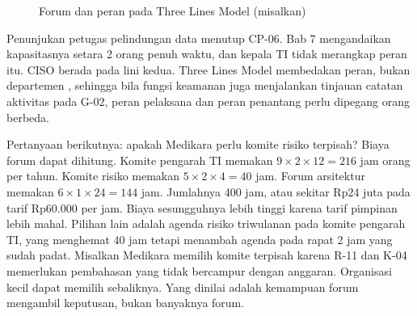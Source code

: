 \begin{figure}[!htb]
  \centering
  
  \caption{Forum dan peran pada Three Lines Model (misalkan)}
  \label{fig:ch08-peta-peran}
\end{figure}

Penunjukan petugas pelindungan data menutup CP-06. Bab 7 mengandaikan kapasitasnya setara 2 orang
penuh waktu, dan kepala TI tidak merangkap peran itu. CISO berada pada lini kedua. Three Lines
Model membedakan peran, bukan departemen \cite{iia-tlm2026}, sehingga bila fungsi keamanan juga
menjalankan tinjauan catatan aktivitas pada G-02, peran pelaksana dan peran penantang perlu
dipegang orang berbeda.

Pertanyaan berikutnya: apakah Medikara perlu komite risiko terpisah? Biaya forum dapat dihitung.
Komite pengarah TI memakan $9 \times 2 \times 12 = 216$ jam orang per tahun. Komite risiko
memakan $5 \times 2 \times 4 = 40$ jam. Forum arsitektur memakan $6 \times 1 \times 24 = 144$ jam.
Jumlahnya 400 jam, atau sekitar Rp24 juta pada tarif Rp60.000 per jam. Biaya sesungguhnya lebih
tinggi karena tarif pimpinan lebih mahal. Pilihan lain adalah agenda risiko triwulanan pada
komite pengarah TI, yang menghemat 40 jam tetapi menambah agenda pada rapat 2 jam yang sudah
padat. Misalkan Medikara memilih komite terpisah karena R-11 dan K-04 memerlukan pembahasan yang
tidak bercampur dengan anggaran. Organisasi kecil dapat memilih sebaliknya. Yang dinilai adalah
kemampuan forum mengambil keputusan, bukan banyaknya forum.

